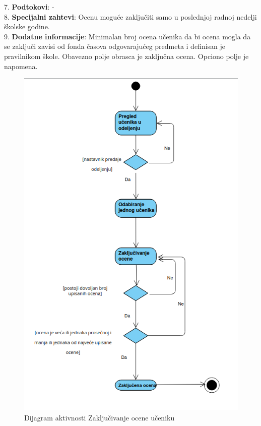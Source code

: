 \documentclass{article}
\begin{document}
7. \textbf{Podtokovi}: - \\

8. \textbf{Specijalni zahtevi}: Ocenu moguće zaključiti samo u poslednjoj radnoj nedelji školske godine. \\

9. \textbf{Dodatne informacije}: Minimalan broj ocena učenika da bi ocena mogla da se zaključi zavisi od fonda časova odgovarajućeg predmeta i definisan je pravilnikom škole. Obavezno polje obrasca je zaključna ocena. Opciono polje je napomena. \\

\begin{figure} [!ht]
    \begin{center}
        \includegraphics[scale=0.4]{imgs/Dijagram_aktivnosti_nastavnik_zaključuje_ocenu.png}
    \end{center}
\caption{Dijagram aktivnosti Zaključivanje ocene učeniku}
\end{figure}
\end{document}

